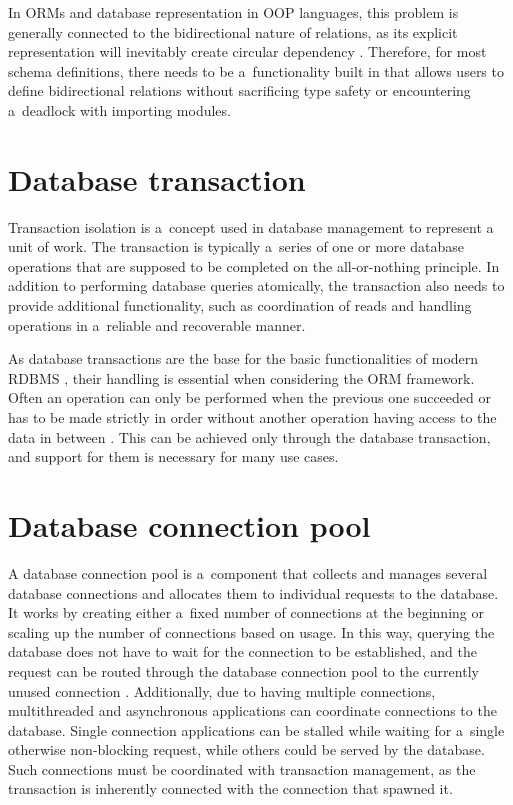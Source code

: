 In ORMs and database representation in OOP languages, this problem is generally
connected to the bidirectional nature of relations, as its explicit
representation will inevitably create circular dependency
\cite{melton-empirical-2007}. Therefore, for most schema definitions, there
needs to be a~functionality built in that allows users to define bidirectional
relations without sacrificing type safety or encountering a~deadlock with
importing modules. 


\section*{Database transaction}
Transaction isolation is a~concept used in database management to represent a
unit of work. The transaction is typically a~series of one or more database
operations that are supposed to be completed on the all-or-nothing principle. In
addition to performing database queries atomically, the transaction also needs
to provide additional functionality, such as coordination of reads and handling
operations in a~reliable and recoverable manner. 

As database transactions are the base for the basic functionalities of modern
RDBMS \cite{haerder-principles-1983}, their handling is essential when
considering the ORM framework. Often an operation can only be performed when the
previous one succeeded or has to be made strictly in order without another
operation having access to the data in between \cite{postgres-transaction}. This
can be achieved only through the database transaction, and support for them is
necessary for many use cases.


\section*{Database connection pool}
A database connection pool is a~component that collects and manages several
database connections and allocates them to individual requests to the database.
It works by creating either a~fixed number of connections at the beginning or
scaling up the number of connections based on usage. In this way, querying the
database does not have to wait for the connection to be established, and the
request can be routed through the database connection pool to the currently
unused connection \cite{gupta-improving-2017}. Additionally, due to having
multiple connections, multithreaded and asynchronous applications can coordinate
connections to the database. Single connection applications can be stalled while
waiting for a~single otherwise non-blocking request, while others could be
served by the database. Such connections must be coordinated with transaction
management, as the transaction is inherently connected with the connection that
spawned it. 


